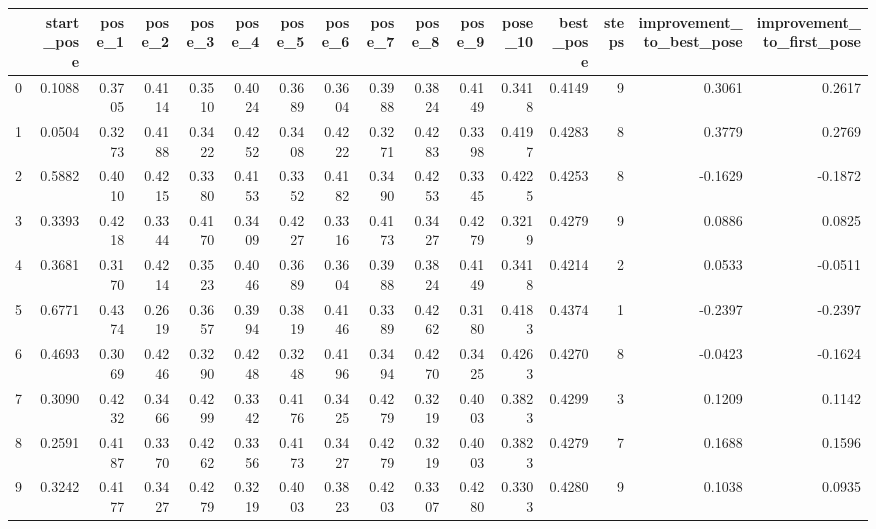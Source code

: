 \begin{tabular}{lrrrrrrrrrrrrrrr}
\toprule
{} &  start\_pose &  pose\_1 &  pose\_2 &  pose\_3 &  pose\_4 &  pose\_5 &  pose\_6 &  pose\_7 &  pose\_8 &  pose\_9 &  pose\_10 &  best\_pose &  steps &  improvement\_to\_best\_pose &  improvement\_to\_first\_pose \\
\midrule
0 &      0.1088 &  0.3705 &  0.4114 &  0.3510 &  0.4024 &  0.3689 &  0.3604 &  0.3988 &  0.3824 &  0.4149 &   0.3418 &     0.4149 &      9 &                    0.3061 &                     0.2617 \\
1 &      0.0504 &  0.3273 &  0.4188 &  0.3422 &  0.4252 &  0.3408 &  0.4222 &  0.3271 &  0.4283 &  0.3398 &   0.4197 &     0.4283 &      8 &                    0.3779 &                     0.2769 \\
2 &      0.5882 &  0.4010 &  0.4215 &  0.3380 &  0.4153 &  0.3352 &  0.4182 &  0.3490 &  0.4253 &  0.3345 &   0.4225 &     0.4253 &      8 &                   -0.1629 &                    -0.1872 \\
3 &      0.3393 &  0.4218 &  0.3344 &  0.4170 &  0.3409 &  0.4227 &  0.3316 &  0.4173 &  0.3427 &  0.4279 &   0.3219 &     0.4279 &      9 &                    0.0886 &                     0.0825 \\
4 &      0.3681 &  0.3170 &  0.4214 &  0.3523 &  0.4046 &  0.3689 &  0.3604 &  0.3988 &  0.3824 &  0.4149 &   0.3418 &     0.4214 &      2 &                    0.0533 &                    -0.0511 \\
5 &      0.6771 &  0.4374 &  0.2619 &  0.3657 &  0.3994 &  0.3819 &  0.4146 &  0.3389 &  0.4262 &  0.3180 &   0.4183 &     0.4374 &      1 &                   -0.2397 &                    -0.2397 \\
6 &      0.4693 &  0.3069 &  0.4246 &  0.3290 &  0.4248 &  0.3248 &  0.4196 &  0.3494 &  0.4270 &  0.3425 &   0.4263 &     0.4270 &      8 &                   -0.0423 &                    -0.1624 \\
7 &      0.3090 &  0.4232 &  0.3466 &  0.4299 &  0.3342 &  0.4176 &  0.3425 &  0.4279 &  0.3219 &  0.4003 &   0.3823 &     0.4299 &      3 &                    0.1209 &                     0.1142 \\
8 &      0.2591 &  0.4187 &  0.3370 &  0.4262 &  0.3356 &  0.4173 &  0.3427 &  0.4279 &  0.3219 &  0.4003 &   0.3823 &     0.4279 &      7 &                    0.1688 &                     0.1596 \\
9 &      0.3242 &  0.4177 &  0.3427 &  0.4279 &  0.3219 &  0.4003 &  0.3823 &  0.4203 &  0.3307 &  0.4280 &   0.3303 &     0.4280 &      9 &                    0.1038 &                     0.0935 \\
\bottomrule
\end{tabular}
